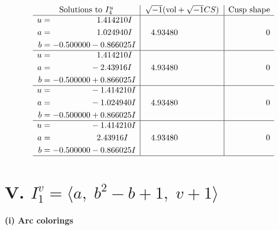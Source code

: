 \documentclass[1p]{elsarticle_modified}
\theoremstyle{definition}
\newcommand{\I}{\sqrt{-1}}
\begin{document}
$$\begin{array}{c|c|c}  
\text{Solutions to }I^u_{4}& \I (\text{vol} + \sqrt{-1}CS) & \text{Cusp shape}\\
 \hline 
\begin{aligned}
u &= \phantom{-0.000000 -}1.414210 I \\
a &= \phantom{-0.000000 -}1.024940 I \\
b &= -0.500000 - 0.866025 I\end{aligned}
 & \phantom{-}4.93480\phantom{ +0.000000I} & \phantom{-0.000000 } 0 \\ \hline\begin{aligned}
u &= \phantom{-0.000000 -}1.414210 I \\
a &= \phantom{-0.000000 } -2.43916 I \\
b &= -0.500000 + 0.866025 I\end{aligned}
 & \phantom{-}4.93480\phantom{ +0.000000I} & \phantom{-0.000000 } 0 \\ \hline\begin{aligned}
u &= \phantom{-0.000000 } -1.414210 I \\
a &= \phantom{-0.000000 } -1.024940 I \\
b &= -0.500000 + 0.866025 I\end{aligned}
 & \phantom{-}4.93480\phantom{ +0.000000I} & \phantom{-0.000000 } 0 \\ \hline\begin{aligned}
u &= \phantom{-0.000000 } -1.414210 I \\
a &= \phantom{-0.000000 -}2.43916 I \\
b &= -0.500000 - 0.866025 I\end{aligned}
 & \phantom{-}4.93480\phantom{ +0.000000I} & \phantom{-0.000000 } 0\\
 \hline 
 \end{array}$$\newpage\newpage\renewcommand{\arraystretch}{1}
\centering \section*{V. $I^v_{1}= \langle a,\;b^2- b+1,\;v+1 \rangle$}
\flushleft \textbf{(i) Arc colorings}\\
\end{document}
